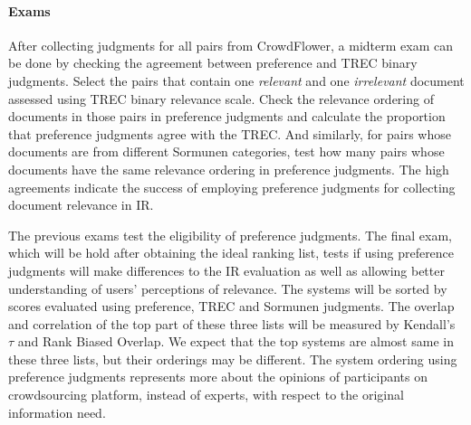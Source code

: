 \documentclass{article}
\begin{document}
\paragraph{Exams}
After collecting judgments for all pairs from CrowdFlower, a midterm exam can be done by checking the agreement between preference and TREC binary judgments. Select the pairs that contain one \textit{relevant} and one \textit{irrelevant} document assessed using TREC binary relevance scale. Check the relevance ordering of documents in those pairs in preference judgments and calculate the proportion that preference judgments agree with the TREC. And similarly, for pairs whose documents are from different Sormunen categories, test how many pairs whose documents have the same relevance ordering in preference judgments. The high agreements indicate the success of employing preference judgments for collecting document relevance in IR.

 The previous exams test the eligibility of preference judgments. The final exam, which will be hold after obtaining the ideal ranking list, tests if using preference judgments will make differences to the IR evaluation as well as allowing better understanding of users' perceptions of relevance. The systems will be sorted by scores evaluated using preference, TREC and Sormunen judgments. The overlap and correlation of the top part of these three lists will be measured by Kendall's $\tau$ and Rank Biased Overlap. We expect that the top systems are almost same in these three lists, but their orderings may be different. The system ordering using preference judgments represents more about the opinions of participants on crowdsourcing platform, instead of experts, with respect to the original information need.







\end{document}

